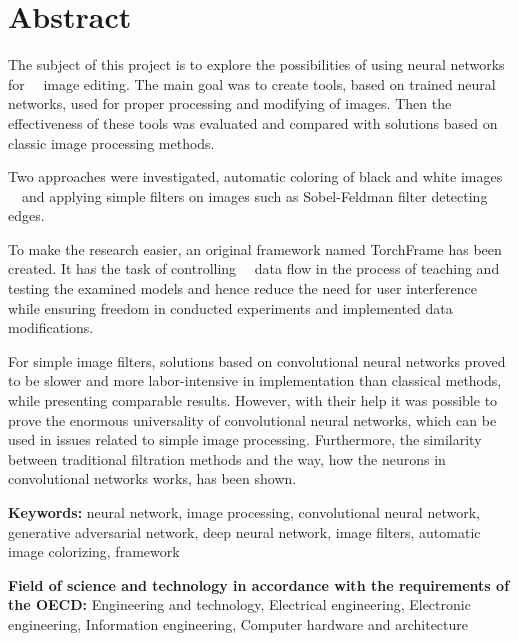 \section*{Abstract}

  The subject of this project is to explore the possibilities of using neural networks for
  image editing. The main goal was to create tools, based on
  trained neural networks, used for proper processing and modifying of
  images. Then the effectiveness of these tools was evaluated and
  compared with solutions based on classic image processing methods.

  Two approaches were investigated, automatic coloring of black and white images
  and applying simple filters on images such as Sobel-Feldman filter detecting edges.

  To make the research easier, an original framework named TorchFrame has been created.
  It has the task of controlling
  data flow in the process of teaching and testing the examined models and hence
  reduce the need for user interference while ensuring freedom
  in conducted experiments and implemented data modifications.

  For simple image filters, solutions based on convolutional neural networks proved to
  be slower and more labor-intensive in implementation than classical methods,
  while presenting comparable results.
  However, with their help it was possible to prove the enormous universality
  of convolutional neural networks, which can be used in issues related to
  simple image processing. Furthermore, the similarity between traditional filtration
  methods and the way, how the neurons in convolutional networks works, has been shown.

  \bigskip

  \noindent\textbf{Keywords:} neural network, image processing, convolutional
  neural network, generative adversarial network, deep neural network,
  image filters, automatic image colorizing, framework

  \bigskip

  \noindent\textbf{Field of science and technology in accordance with the
  requirements of the OECD:} Engineering and technology, Electrical engineering,
  Electronic engineering, Information engineering, Computer hardware and
  architecture
